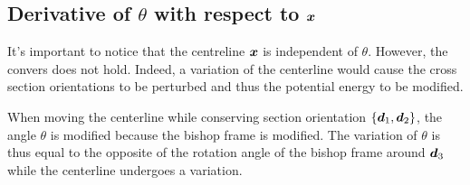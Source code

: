 \subsection{Derivative of $\theta$ with respect to $\boldsymbol{x}$}
It’s important to notice that the centreline $\boldsymbol{x}$ is independent of $\theta$. However, the convers does not hold. Indeed, a variation of the centerline would cause the cross section orientations to be perturbed and thus the potential energy to be modified.

When moving the centerline while conserving section orientation $\{\boldsymbol{d}_1,\boldsymbol{d}_2\}$,  the angle $\theta$ is modified because the bishop frame is modified. The variation of $\theta$ is thus equal to the opposite of the rotation angle of the bishop frame around $\boldsymbol{d}_3$ while the centerline undergoes a variation.

